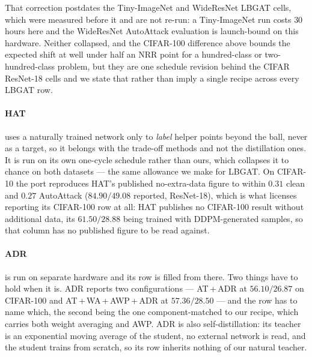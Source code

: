 That correction postdates the Tiny-ImageNet and WideResNet LBGAT cells, which were measured before it
and are not re-run: a Tiny-ImageNet run costs $30$ hours here and the WideResNet AutoAttack evaluation
is launch-bound on this hardware. Neither collapsed, and the CIFAR-100 difference above bounds the
expected shift at well under half an NRR point for a hundred-class or two-hundred-class problem, but
they are one schedule revision behind the CIFAR ResNet-18 cells and we state that rather than imply a
single recipe across every LBGAT row.

\paragraph{HAT} uses a naturally trained network only to \emph{label} helper points beyond the ball,
never as a target, so it belongs with the trade-off methods and not the distillation ones. It is run
on its own one-cycle schedule rather than ours, which collapses it to chance on both datasets --- the
same allowance we make for LBGAT. On CIFAR-10 the port reproduces HAT's published no-extra-data figure
to within $0.31$ clean and $0.27$ AutoAttack ($84.90 / 49.08$ reported, ResNet-18), which is what
licenses reporting its CIFAR-100 row at all: HAT publishes no CIFAR-100 result without additional data,
its $61.50 / 28.88$ being trained with DDPM-generated samples, so that column has no published figure
to be read against.

\paragraph{ADR} is run on separate hardware and its row is filled from there. Two things have to hold
when it is. ADR reports two configurations --- AT\,+\,ADR at $56.10 / 26.87$ on CIFAR-100 and
AT\,+\,WA\,+\,AWP\,+\,ADR at $57.36 / 28.50$ --- and the row has to name which, the second being the
one component-matched to our recipe, which carries both weight averaging and AWP. ADR is also
self-distillation: its teacher is an exponential moving average of the student, no external network is
read, and the student trains from scratch, so its row inherits nothing of our natural teacher.

